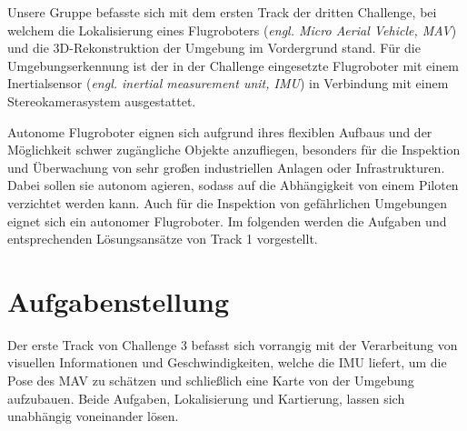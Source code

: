 \documentclass[12pt,titlepage, a4paper]{article}
\begin{document}
Unsere Gruppe befasste sich mit dem ersten Track der dritten Challenge, bei welchem die Lokalisierung eines Flugroboters (\textit{engl. Micro Aerial Vehicle, MAV}) und die 3D-Rekonstruktion 
der Umgebung im Vordergrund stand.
Für die Umgebungserkennung ist der in der Challenge eingesetzte Flugroboter mit einem Inertialsensor (\textit{engl. inertial measurement unit, IMU}) in Verbindung mit einem Stereokamerasystem ausgestattet. 


Autonome Flugroboter eignen sich aufgrund ihres flexiblen Aufbaus und der Möglichkeit schwer zugängliche Objekte anzufliegen, besonders für die Inspektion und Überwachung von sehr großen industriellen
Anlagen oder Infrastrukturen. Dabei sollen sie autonom agieren, sodass auf die Abhängigkeit von einem Piloten verzichtet werden kann.
Auch für die Inspektion von gefährlichen Umgebungen eignet sich ein autonomer Flugroboter.
Im folgenden werden die Aufgaben und entsprechenden Lösungsansätze von Track 1 vorgestellt.





\section{Aufgabenstellung} 
Der erste Track von Challenge 3 befasst sich vorrangig mit der Verarbeitung von visuellen Informationen und Geschwindigkeiten, welche die IMU liefert, um die Pose des MAV zu schätzen
und schließlich eine Karte von der Umgebung aufzubauen. Beide Aufgaben, Lokalisierung und Kartierung, lassen sich unabhängig voneinander lösen.
\end{document}
